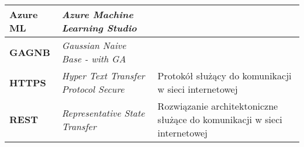 \begin{table}[H]
\begin{tabularx}{\linewidth}{lXX}
        \textbf{Azure ML} & \textit{Azure Machine Learning Studio} & \\ \hline
        \textbf{GAGNB} & \textit{Gaussian Naive Base - with GA} & \\ \hline
        \textbf{HTTPS} & \textit{Hyper Text Transfer Protocol Secure} & Protokół służący do komunikacji w sieci internetowej \\ \hline
        \textbf{REST} & \textit{Representative State Transfer} & Rozwiązanie architektoniczne służące do komunikacji w sieci internetowej \\ \hline
    \end{tabularx}
    \label{tab:shorts}
\end{table}